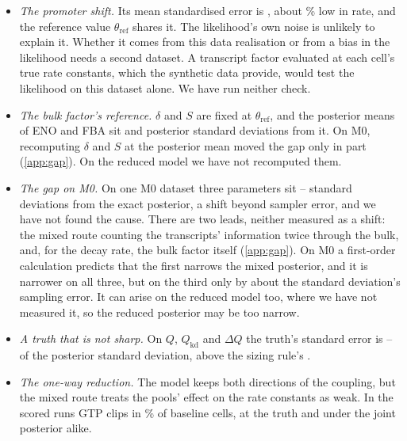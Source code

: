 \begin{itemize}
  The \% spread in $Q$ is precision under a correct model. The pools show
  that this precision is not a calibrated uncertainty on every output. Real assays need
  observation models for unknown cell numbers in bulk metabolomics and for capture efficiency
  in single-cell RNA counts.
  \item \emph{The promoter shift.} Its mean standardised error is , about
  \% low in rate, and the reference value $\theta_{\mathrm{ref}}$ shares it.
  The likelihood's own noise is unlikely to explain it. Whether it comes from this data
  realisation or from a bias in the likelihood needs a second dataset. A transcript factor
  evaluated at each cell's true rate constants, which the synthetic data provide, would test the
  likelihood on this dataset alone. We have run neither check.
  \item \emph{The bulk factor's reference.} $\delta$ and $S$ are fixed at $\theta_{\mathrm{ref}}$,
  and the posterior means of ENO and FBA sit  and  posterior
  standard deviations from it. On M0, recomputing $\delta$ and $S$ at the posterior mean moved the
  gap only in part (\cref{app:gap}). On the reduced model we have not recomputed them.
  \item \emph{The gap on M0.} On one M0 dataset three parameters sit --
  standard deviations from the exact posterior, a shift beyond sampler error, and we have not
  found the cause. There are two leads, neither measured as a shift: the mixed route counting
  the transcripts' information twice through the bulk, and, for the decay rate, the bulk factor
  itself (\cref{app:gap}). On M0 a first-order calculation predicts that the first narrows the mixed posterior, and it is narrower on all three, but on the third only by about the standard deviation's sampling error. It can arise on the
  reduced model too, where we have not measured it, so the reduced posterior may be too narrow.
  \item \emph{A truth that is not sharp.} On $Q$, $Q_{\mathrm{kd}}$ and $\Delta Q$ the truth's
  standard error is -- of the posterior standard deviation,
  above the sizing rule's .
  \item \emph{The one-way reduction.} The model keeps both directions of the coupling, but
  the mixed route treats the pools' effect on the rate constants as weak. In the scored runs GTP
  clips in \% of baseline cells, at the truth and under the joint posterior alike.

\end{itemize}
